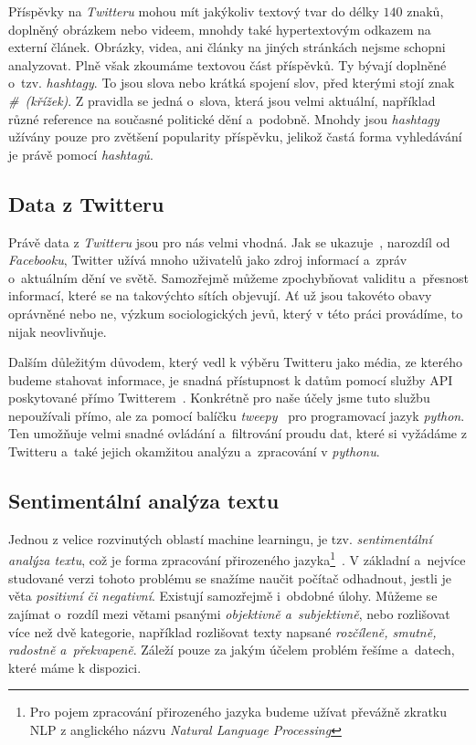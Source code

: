 \documentclass[12pt, a4paper]{article}
\numberwithin{equation}{section} 	%
\begin{document}
Příspěvky na \textit{Twitteru} mohou mít jakýkoliv textový tvar do délky $140$ znaků, doplněný obrázkem nebo videem, mnohdy také hypertextovým odkazem na externí článek. Obrázky, videa, ani články na jiných stránkách nejsme schopni analyzovat. Plně však zkoumáme textovou část příspěvků. Ty bývají doplněné o~tzv. \textit{hashtagy}. To jsou slova nebo krátká spojení slov, před kterými stojí znak \textit{\#~(křížek)}. Z pravidla se jedná o~slova, která jsou velmi aktuální, například různé reference na současné politické dění a~podobně. Mnohdy jsou \textit{hashtagy} užívány pouze pro zvětšení popularity příspěvku, jelikož častá forma vyhledávání je právě pomocí \textit{hashtagů}.

\subsection{Data z Twitteru}
\noindent Právě data z \textit{Twitteru} jsou pro nás velmi vhodná. Jak se ukazuje~\cite{whyNotFb}, narozdíl od \textit{Facebooku}, Twitter užívá mnoho uživatelů jako zdroj informací a~zpráv o~ak\-tu\-ál\-ním dění ve světě. Samozřejmě můžeme zpochybňovat validitu a~přesnost informací, které se na takovýchto sítích objevují. Ať už jsou takovéto obavy oprávněné nebo ne, výzkum sociologických jevů, který v této práci provádíme, to nijak neovlivňuje.

Dalším důležitým důvodem, který vedl k výběru Twitteru jako média, ze kterého budeme stahovat informace, je snadná přístupnost k datům pomocí služby API poskytované přímo Twitterem~\cite{twitterAPI}. Konkrétně pro naše účely jsme tuto službu nepoužívali přímo, ale za pomocí balíčku \textit{tweepy}~\cite{tweepy} pro programovací jazyk \textit{python}. Ten umožňuje velmi snadné ovládání a~filtrování proudu dat, které si vyžádáme z Twitteru a~také jejich okamžitou analýzu a~zpracování v \textit{pythonu}.

\subsection{Sentimentální analýza textu}
\noindent Jednou z velice rozvinutých oblastí machine learningu, je tzv. \textit{sentimentální a\-na\-lý\-za textu}, což je forma zpracování přirozeného jazyka\footnote{Pro pojem zpracování přirozeného jazyka budeme užívat převážně zkratku NLP z anglického názvu \textit{Natural Language Processing}}~\cite{NLTKbook}. V základní a~nejvíce studované verzi tohoto problému se snažíme naučit počítač odhadnout, jestli je věta \textit{positivní či negativní}. Existují samozřejmě i~obdobné úlohy. Můžeme se zajímat o~rozdíl mezi větami psanými \textit{objektivně a~subjektivně}, nebo rozlišovat více než dvě kategorie, například rozlišovat texty napsané \textit{rozčíleně, smutně, radostně a~překvapeně}. Záleží pouze za jakým účelem problém řešíme a~datech, které máme k dispozici.
\end{document}
